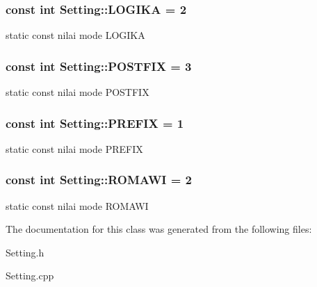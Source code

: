 \subsubsection[{L\+O\+G\+I\+K\+A}]{\setlength{\rightskip}{0pt plus 5cm}const int Setting\+::\+L\+O\+G\+I\+K\+A = 2\hspace{0.3cm}{\ttfamily [static]}}\label{class_setting_aa034225cee86523b7d4ebd13f329150f}
static const nilai mode L\+O\+G\+I\+K\+A \hypertarget{class_setting_a16ec949916d2e90e56d68e039eaac356}{}
\subsubsection[{P\+O\+S\+T\+F\+I\+X}]{\setlength{\rightskip}{0pt plus 5cm}const int Setting\+::\+P\+O\+S\+T\+F\+I\+X = 3\hspace{0.3cm}{\ttfamily [static]}}\label{class_setting_a16ec949916d2e90e56d68e039eaac356}
static const nilai mode P\+O\+S\+T\+F\+I\+X \hypertarget{class_setting_aa7284982909e57a05a7c0f8a3f19c5f4}{}
\subsubsection[{P\+R\+E\+F\+I\+X}]{\setlength{\rightskip}{0pt plus 5cm}const int Setting\+::\+P\+R\+E\+F\+I\+X = 1\hspace{0.3cm}{\ttfamily [static]}}\label{class_setting_aa7284982909e57a05a7c0f8a3f19c5f4}
static const nilai mode P\+R\+E\+F\+I\+X \hypertarget{class_setting_abac30ca862140b74bd188c8b3da16a02}{}
\subsubsection[{R\+O\+M\+A\+W\+I}]{\setlength{\rightskip}{0pt plus 5cm}const int Setting\+::\+R\+O\+M\+A\+W\+I = 2\hspace{0.3cm}{\ttfamily [static]}}\label{class_setting_abac30ca862140b74bd188c8b3da16a02}
static const nilai mode R\+O\+M\+A\+W\+I 

The documentation for this class was generated from the following files\+:\begin{DoxyCompactItemize}
\item 
Setting.\+h\item 
Setting.\+cpp\end{DoxyCompactItemize}
